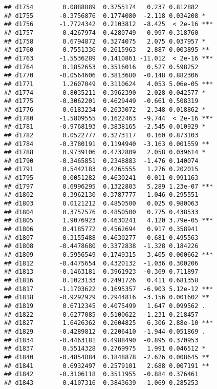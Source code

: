\documentclass[
]{article}
\begin{document}
\begin{verbatim}
## d1754        0.0888889  0.3755174   0.237 0.812882    
## d1755       -0.3756876  0.1774080  -2.118 0.034208 *  
## d1756       -1.7724342  0.2103812  -8.425  < 2e-16 ***
## d1757        0.4267974  0.4280749   0.997 0.318760    
## d1758        0.6794872  0.3274075   2.075 0.037957 *  
## d1760        0.7551336  0.2615963   2.887 0.003895 ** 
## d1763       -1.5536289  0.1410861 -11.012  < 2e-16 ***
## d1764        0.1852653  0.3516016   0.527 0.598252    
## d1770       -0.0564606  0.3813680  -0.148 0.882306    
## d1771        1.2607049  0.3110624   4.053 5.06e-05 ***
## d1774        0.8035211  0.3962390   2.028 0.042577 *  
## d1775       -0.3062201  0.4629449  -0.661 0.508319    
## d1776        0.6183234  0.2633072   2.348 0.018862 *  
## d1780       -1.5809555  0.1622463  -9.744  < 2e-16 ***
## d1781       -0.9768193  0.3838165  -2.545 0.010929 *  
## d1782        0.0522777  0.3273117   0.160 0.873103    
## d1784       -0.3780191  0.1194940  -3.163 0.001559 ** 
## d1788        0.9739106  0.4732809   2.058 0.039614 *  
## d1790       -0.3465851  0.2348883  -1.476 0.140074    
## d1791        0.5442183  0.4265555   1.276 0.202015    
## d1795        0.0051282  0.4630241   0.011 0.991163    
## d1797        0.6996295  0.1322803   5.289 1.23e-07 ***
## d1802        0.3962130  0.3787777   1.046 0.295551    
## d1803        0.0121212  0.4850500   0.025 0.980063    
## d1804        0.3757576  0.4850500   0.775 0.438533    
## d1805        1.9076923  0.4630241   4.120 3.79e-05 ***
## d1806        0.4185772  0.4562694   0.917 0.358941    
## d1807        0.3155488  0.4630277   0.681 0.495563    
## d1808       -0.4478680  0.3372838  -1.328 0.184226    
## d1809       -0.5956549  0.1749315  -3.405 0.000662 ***
## d1812       -0.4475654  0.4320132  -1.036 0.300206    
## d1813       -0.1463181  0.3961923  -0.369 0.711897    
## d1816        0.1023133  0.2491726   0.411 0.681358    
## d1817       -1.1703622  0.1695357  -6.903 5.12e-12 ***
## d1818       -0.9292929  0.2944816  -3.156 0.001602 ** 
## d1819        0.6712345  0.4075499   1.647 0.099562 .  
## d1822       -0.6277085  0.5100622  -1.231 0.218457    
## d1827        1.6426362  0.2604825   6.306 2.88e-10 ***
## d1829       -0.4289812  0.2206410  -1.944 0.051869 .  
## d1834       -0.4463181  0.4988490  -0.895 0.370953    
## d1837        0.5514328  0.2769975   1.991 0.046512 *  
## d1840       -0.4854884  0.1848878  -2.626 0.008645 ** 
## d1841        0.6932497  0.2579101   2.688 0.007191 ** 
## d1842       -0.3106118  0.3511955  -0.884 0.376461    
## d1843        0.4107316  0.3843639   1.069 0.285253    

\end{verbatim}
\end{document}

